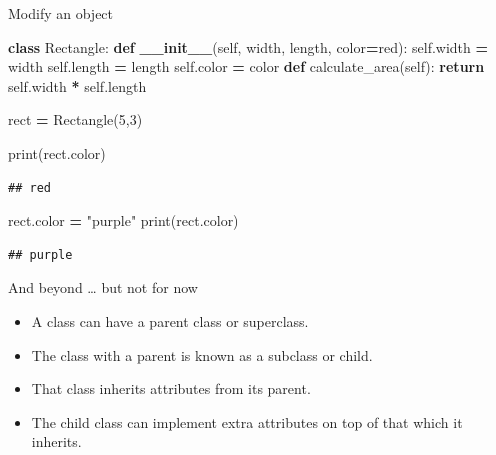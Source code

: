 \documentclass[
  8pt,
  ignorenonframetext,
]{beamer}
\newenvironment{Shaded}{\begin{snugshade}}{\end{snugshade}}
\newcommand{\BuiltInTok}[1]{#1}
\newcommand{\ControlFlowTok}[1]{\textcolor[rgb]{0.13,0.29,0.53}{\textbf{#1}}}
\newcommand{\DecValTok}[1]{\textcolor[rgb]{0.00,0.00,0.81}{#1}}
\newcommand{\FunctionTok}[1]{\textcolor[rgb]{0.13,0.29,0.53}{\textbf{#1}}}
\newcommand{\KeywordTok}[1]{\textcolor[rgb]{0.13,0.29,0.53}{\textbf{#1}}}
\newcommand{\NormalTok}[1]{#1}
\newcommand{\OperatorTok}[1]{\textcolor[rgb]{0.81,0.36,0.00}{\textbf{#1}}}
\newcommand{\StringTok}[1]{\textcolor[rgb]{0.31,0.60,0.02}{#1}}
\newcommand{\VariableTok}[1]{\textcolor[rgb]{0.00,0.00,0.00}{#1}}
\begin{document}
\begin{frame}[fragile]{Modify an object}
\protect\hypertarget{modify-an-object}{}
\begin{Shaded}
\begin{Highlighting}[]
\KeywordTok{class}\NormalTok{ Rectangle:}
    \KeywordTok{def} \FunctionTok{\_\_init\_\_}\NormalTok{(}\VariableTok{self}\NormalTok{, width, length, color}\OperatorTok{=}\StringTok{\textquotesingle{}red\textquotesingle{}}\NormalTok{):}
        \VariableTok{self}\NormalTok{.width }\OperatorTok{=}\NormalTok{ width}
        \VariableTok{self}\NormalTok{.length }\OperatorTok{=}\NormalTok{ length}
        \VariableTok{self}\NormalTok{.color }\OperatorTok{=}\NormalTok{ color}
    \KeywordTok{def}\NormalTok{ calculate\_area(}\VariableTok{self}\NormalTok{):}
      \ControlFlowTok{return} \VariableTok{self}\NormalTok{.width }\OperatorTok{*} \VariableTok{self}\NormalTok{.length}

\NormalTok{rect }\OperatorTok{=}\NormalTok{ Rectangle(}\DecValTok{5}\NormalTok{,}\DecValTok{3}\NormalTok{)}

\BuiltInTok{print}\NormalTok{(rect.color)}
\end{Highlighting}
\end{Shaded}

\begin{verbatim}
## red
\end{verbatim}

\begin{Shaded}
\begin{Highlighting}[]
\NormalTok{rect.color }\OperatorTok{=} \StringTok{"purple"}  
\BuiltInTok{print}\NormalTok{(rect.color)}
\end{Highlighting}
\end{Shaded}

\begin{verbatim}
## purple
\end{verbatim}
\end{frame}

\begin{frame}{And beyond \ldots{} but not for now}
\protect\hypertarget{and-beyond-but-not-for-now}{}
\begin{itemize}
\item
  A class can have a parent class or superclass.
\item
  The class with a parent is known as a subclass or child.
\item
  That class inherits attributes from its parent.
\item
  The child class can implement extra attributes on top of that which it
  inherits.
\end{itemize}
\end{frame}
\end{document}
